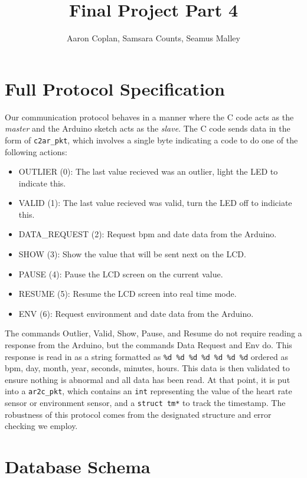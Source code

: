 \documentclass[]{article}
\title{Final Project Part 4}
\author{Aaron Coplan, Samsara Counts, Seamus Malley}
\date{}
\providecommand{\tightlist}{%
  \setlength{\itemsep}{0pt}\setlength{\parskip}{0pt}}
\begin{document}
\maketitle

\section{Full Protocol Specification}\label{full-protocol-specification}

Our communication protocol behaves in a manner where the C code acts as
the \emph{master} and the Arduino sketch acts as the \emph{slave}. The C
code sends data in the form of \texttt{c2ar\_pkt}, which involves a
single byte indicating a code to do one of the following actions:

\begin{itemize}
\tightlist
\item
  OUTLIER (0): The last value recieved was an outlier, light the LED to
  indicate this.
\item
  VALID (1): The last value recieved was valid, turn the LED off to
  indiciate this.
\item
  DATA\_REQUEST (2): Request bpm and date data from the Arduino.
\item
  SHOW (3): Show the value that will be sent next on the LCD.
\item
  PAUSE (4): Pause the LCD screen on the current value.
\item
  RESUME (5): Resume the LCD screen into real time mode.
\item
  ENV (6): Request environment and date data from the Arduino.
\end{itemize}

The commands Outlier, Valid, Show, Pause, and Resume do not require
reading a response from the Arduino, but the commands Data Request and
Env do. This response is read in as a string formatted as
\texttt{\%d\ \%d\ \%d\ \%d\ \%d\ \%d\ \%d} ordered as bpm, day, month,
year, seconds, minutes, hours. This data is then validated to ensure
nothing is abnormal and all data has been read. At that point, it is put
into a \texttt{ar2c\_pkt}, which contains an \texttt{int} representing
the value of the heart rate sensor or environment sensor, and a
\texttt{struct\ tm*} to track the timestamp. The robustness of this
protocol comes from the designated structure and error checking we
employ.

\section{Database Schema}\label{database-schema}
\end{document}
